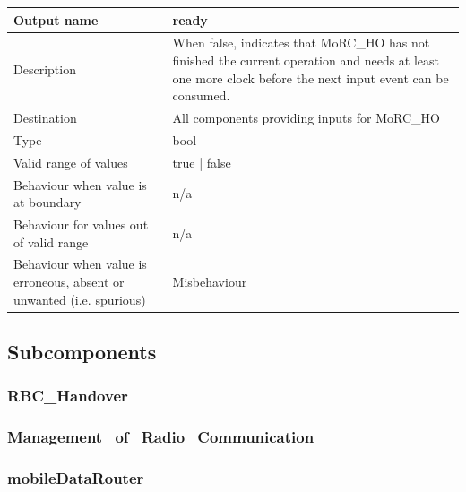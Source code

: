 \begin{longtable}{p{}p{}}
	\toprule
	Output name				& ready \\
	\midrule
	Description				& When false, indicates that MoRC\_HO has not finished the current operation and needs at least one more clock before the next input event can be consumed. \\
	\midrule
	Destination				& All components providing inputs for MoRC\_HO \\ 
	\midrule
	Type					& bool \\
	\midrule
	Valid range of values	& true | false \\
	\midrule
	Behaviour when value is at boundary	& n/a \\
	\midrule
	Behaviour for values out of valid range	& n/a \\
	\midrule
	Behaviour when value is erroneous, absent or unwanted (i.e. spurious) & Misbehaviour \\
	\bottomrule
\end{longtable}



\subsection{Subcomponents}\label{s:manage_radio_communication_subcomponents}

\subsubsection{RBC\_Handover}


\subsubsection{Management\_of\_Radio\_Communication}


\subsubsection{mobileDataRouter}

